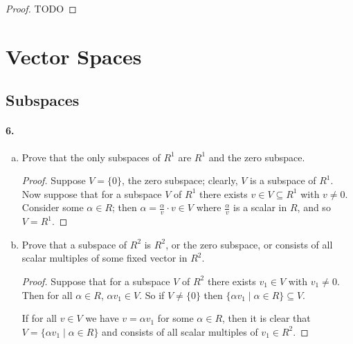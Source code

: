 \documentclass{article}
\begin{document}
\begin{proof}
  TODO
\end{proof}

\section{Vector Spaces}

\setcounter{subsection}{1}
\subsection{Subspaces}

\paragraph{6.}
\begin{enumerate}[(a)]
  \item Prove that the only subspaces of $R^1$ are $R^1$ and the zero subspace.
    \begin{proof}
      Suppose $V = \{0\}$, the zero subspace; clearly, $V$ is a subspace of
      $R^1$. Now suppose that for a subspace $V$ of $R^1$ there exists $v \in
      V \subseteq R^1$ with $v \neq 0$. Consider some $\alpha \in R$; then
      $\alpha = \frac{\alpha}{v} \cdot v \in V$ where $\frac{\alpha}{v}$ is a
      scalar in $R$, and so $V = R^1$.
    \end{proof}
  \item Prove that a subspace of $R^2$ is $R^2$, or the zero subspace, or
    consists of all scalar multiples of some fixed vector in $R^2$.
    \begin{proof}
      Suppose that for a subspace $V$ of $R^2$ there exists $v_1 \in V$ with
      $v_1 \neq 0$. Then for all $\alpha \in R$, $\alpha v_1 \in V$. So if $V
      \neq \{0\}$ then $\{\alpha v_1 \mid \alpha \in R\} \subseteq V$.

      If for all $v \in V$ we have $v = \alpha v_1$ for some $\alpha \in R$,
      then it is clear that $V = \{\alpha v_1 \mid \alpha \in R\}$ and consists
      of all scalar multiples of $v_1 \in R^2$.


\end{proof}
\end{enumerate}
\end{document}
